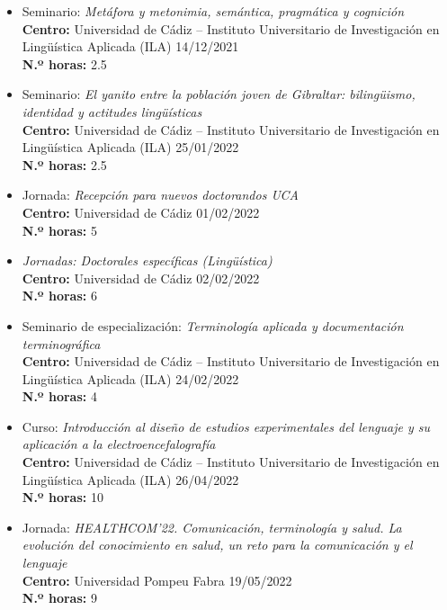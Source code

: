 \begin{enumerate}[label=\alph*)]
\begin{itemize}
\begin{itemize}[label=\textbullet]
  \item Seminario: \textit{Metáfora y metonimia, semántica, pragmática y cognición}\\
  \textbf{Centro:} Universidad de Cádiz – Instituto Universitario de Investigación en Lingüística Aplicada (ILA)
  \hfill 14/12/2021\\
  \textbf{N.º horas:} 2.5

  \item Seminario: \textit{El yanito entre la población joven de Gibraltar: bilingüismo, identidad y actitudes lingüísticas}\\
  \textbf{Centro:} Universidad de Cádiz – Instituto Universitario de Investigación en Lingüística Aplicada (ILA)
  \hfill 25/01/2022\\
  \textbf{N.º horas:} 2.5

  \item Jornada: \textit{Recepción para nuevos doctorandos UCA}\\
  \textbf{Centro:} Universidad de Cádiz
  \hfill 01/02/2022\\
  \textbf{N.º horas:} 5

  \item \textit{Jornadas: Doctorales específicas (Lingüística)}\\
  \textbf{Centro:} Universidad de Cádiz
  \hfill 02/02/2022\\
  \textbf{N.º horas:} 6

  \item Seminario de especialización: \textit{Terminología aplicada y documentación terminográfica}\\
  \textbf{Centro:} Universidad de Cádiz – Instituto Universitario de Investigación en Lingüística Aplicada (ILA)
  \hfill 24/02/2022\\
  \textbf{N.º horas:} 4

  \item Curso: \textit{Introducción al diseño de estudios experimentales del lenguaje y su aplicación a la electroencefalografía}\\
  \textbf{Centro:} Universidad de Cádiz – Instituto Universitario de Investigación en Lingüística Aplicada (ILA)
  \hfill 26/04/2022\\
  \textbf{N.º horas:} 10

  \item Jornada: \textit{HEALTHCOM’22. Comunicación, terminología y salud. La evolución del conocimiento en salud, un reto para la comunicación y el lenguaje}\\
  \textbf{Centro:} Universidad Pompeu Fabra
  \hfill 19/05/2022\\
  \textbf{N.º horas:} 9


\end{itemize}
\end{itemize}
\end{enumerate}
